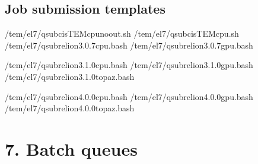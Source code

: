 \documentclass[a4paper,10pt,english]{sphinxmanual}
\begin{document}
\subsection{Job submission templates}
\label{\detokenize{newfarm:job-submission-templates}}
\begin{sphinxVerbatim}[commandchars=\\\{\}]
/tem/el7/qsub\PYGZhy{}cisTEM\PYGZhy{}cpu\PYGZhy{}noout.sh
/tem/el7/qsub\PYGZhy{}cisTEM\PYGZhy{}cpu.sh
/tem/el7/qsub\PYGZhy{}relion\PYGZhy{}3.0.7\PYGZhy{}cpu.bash
/tem/el7/qsub\PYGZhy{}relion\PYGZhy{}3.0.7\PYGZhy{}gpu.bash

/tem/el7/qsub\PYGZhy{}relion\PYGZhy{}3.1.0\PYGZhy{}cpu.bash
/tem/el7/qsub\PYGZhy{}relion\PYGZhy{}3.1.0\PYGZhy{}gpu.bash
/tem/el7/qsub\PYGZhy{}relion\PYGZhy{}3.1.0\PYGZhy{}topaz.bash

/tem/el7/qsub\PYGZhy{}relion\PYGZhy{}4.0.0\PYGZhy{}cpu.bash
/tem/el7/qsub\PYGZhy{}relion\PYGZhy{}4.0.0\PYGZhy{}gpu.bash
/tem/el7/qsub\PYGZhy{}relion\PYGZhy{}4.0.0\PYGZhy{}topaz.bash
\end{sphinxVerbatim}


\section{7. Batch queues}
\label{\detokenize{newfarm:batch-queues}}
\end{document}
